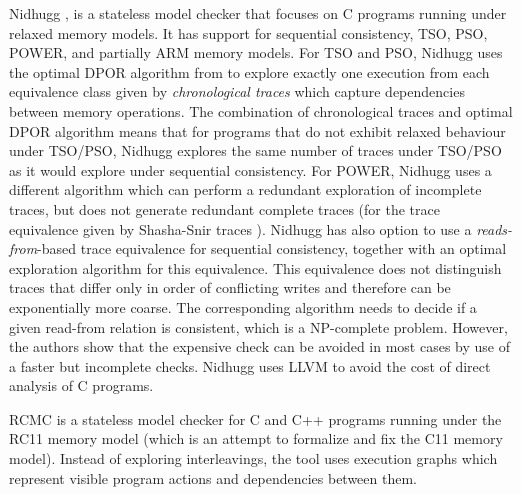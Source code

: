 Nidhugg , is a
stateless model checker that focuses on C programs running under relaxed memory
models.
It has support for sequential consistency, TSO, PSO, POWER, and partially ARM
memory models.
For TSO and PSO, Nidhugg uses the optimal DPOR algorithm from  to explore exactly one execution from each equivalence class given by \emph{chronological traces} which capture dependencies between memory operations.
The combination of chronological traces and optimal DPOR algorithm means that
for programs that do not exhibit relaxed behaviour under TSO/PSO, Nidhugg
explores the same number of traces under TSO/PSO as it would explore under
sequential consistency.
For POWER, Nidhugg uses a different algorithm which can perform a redundant exploration of incomplete traces, but does not generate redundant complete traces (for the trace equivalence given by Shasha-Snir traces ).
Nidhugg has also option to use a \emph{reads-from}-based trace equivalence for sequential consistency, together with an optimal exploration algorithm for this equivalence.
This equivalence does not distinguish traces that differ only in order of conflicting writes and therefore can be exponentially more coarse.
The corresponding algorithm needs to decide if a given read-from relation is consistent, which is a NP-complete problem.
However, the authors show that the expensive check can be avoided in most cases by use of a faster but incomplete checks.
Nidhugg uses LLVM to avoid the cost of direct analysis of C programs.


RCMC  is a stateless model checker for C and C++ programs running under the RC11 memory model  (which is an attempt to formalize and fix the C11 memory model).
Instead of exploring interleavings, the tool uses execution graphs which represent visible program actions and dependencies between them.

